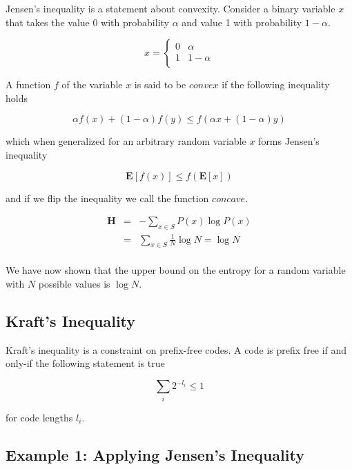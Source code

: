 \documentclass[a4paper,11pt]{book}
\begin{document}
Jensen's inequality is a statement about convexity. Consider a binary variable $x$ that takes the value 0 with probability $\alpha$ and value 1 with probability $1-\alpha$.

\[x= \begin{cases} 
      0 & \alpha \\
      1 & 1-\alpha \\
   \end{cases}
\]

A function $f$ of the variable $x$ is said to be $\textit{convex}$ if the following inequality holds

\begin{equation*}
\alpha f(x) + (1-\alpha)f(y) \leq f(\alpha x + (1-\alpha)y)
\end{equation*}

which when generalized for an arbitrary random variable $x$ forms Jensen's inequality

\begin{equation}
\mathbf{E}[f(x)] \leq f(\mathbf{E}[x])
\end{equation}

and if we flip the inequality we call the function $\textit{concave}$.

\begin{eqnarray*}
\textbf{H} &=& -\sum_{x\in S} P(x)\log P(x) \\
&=& \sum_{x\in S} \frac{1}{N}\log N  = \log N\\
\end{eqnarray*}

We have now shown that the upper bound on the entropy for a random variable with $N$ possible values is $\log N$.

\subsection{Kraft's Inequality}

Kraft's inequality is a constraint on prefix-free codes. A code is prefix free if and only-if the following statement is true

\begin{equation}
\sum_{i} 2^{-l_{i}} \leq 1
\end{equation}

for code lengths $l_{i}$.


\subsection{Example 1: Applying Jensen's Inequality}
\end{document}
